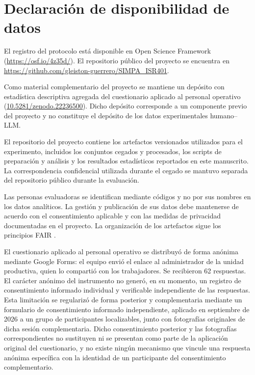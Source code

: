 \documentclass[runningheads]{llncs}
\begin{document}
\section*{Declaraci\'on de disponibilidad de datos}

El registro del protocolo est\'a disponible en Open Science Framework
(\url{https://osf.io/4z35d/}). El repositorio p\'ublico del proyecto se encuentra
en \url{https://github.com/gleiston-guerrero/SIMPA_ISR401}.

Como material complementario del proyecto se mantiene un dep\'osito con
estad\'istica descriptiva agregada del cuestionario aplicado al personal operativo
(\href{https://doi.org/10.5281/zenodo.22236500}{10.5281/zenodo.22236500}).
Dicho dep\'osito corresponde a un componente previo del proyecto y no constituye
el dep\'osito de los datos experimentales humano--LLM.

El repositorio del proyecto contiene los artefactos versionados utilizados para
el experimento, incluidos los conjuntos cegados y procesados, los scripts de
preparaci\'on y an\'alisis y los resultados estad\'isticos reportados en este
manuscrito. La correspondencia confidencial utilizada durante el cegado se
mantuvo separada del repositorio p\'ublico durante la evaluaci\'on.

Las personas evaluadoras se identifican mediante c\'odigos y no por sus nombres
en los datos anal\'iticos. La gesti\'on y publicaci\'on de sus datos debe mantenerse
de acuerdo con el consentimiento aplicable y con las medidas de privacidad
documentadas en el proyecto. La organizaci\'on de los artefactos sigue los
principios FAIR \cite{wilkinson2016}.

El cuestionario aplicado al personal operativo se distribuy\'o de forma
an\'onima mediante Google Forms: el equipo envi\'o el enlace al administrador
de la unidad productiva, quien lo comparti\'o con los trabajadores. Se
recibieron 62 respuestas. El car\'acter an\'onimo del instrumento no gener\'o,
en su momento, un registro de consentimiento informado individual y
verificable independiente de las respuestas. Esta limitaci\'on se
regulariz\'o de forma posterior y complementaria mediante un formulario de
consentimiento informado independiente, aplicado en septiembre de 2026 a un
grupo de participantes localizables, junto con fotograf\'ias originales de
dicha sesi\'on complementaria. Dicho consentimiento posterior y las
fotograf\'ias correspondientes no sustituyen ni se presentan como parte de
la aplicaci\'on original del cuestionario, y no existe ning\'un mecanismo que
vincule una respuesta an\'onima espec\'ifica con la identidad de un
participante del consentimiento complementario.
\end{document}
